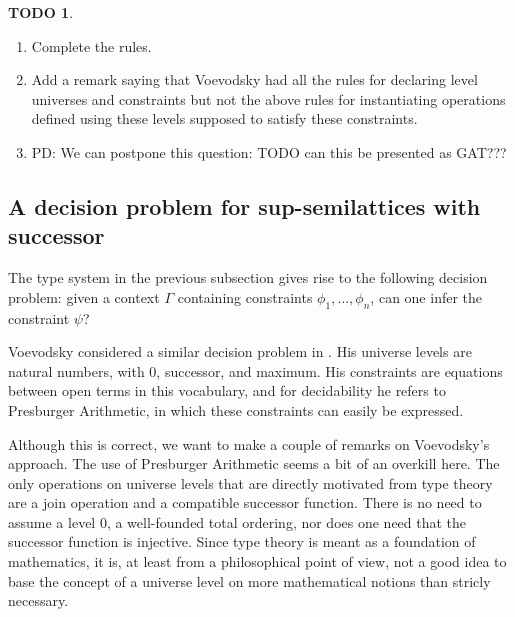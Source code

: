 \documentclass[11pt,a4paper]{article}
\theoremstyle{definition}
\newtheorem{TODO}{TODO}[theorem]
\def\UU{\mathsf{U}}
\begin{document}


\begin{TODO}
  \begin{enumerate}
  \item Complete the rules.
  \item Add a remark saying that Voevodsky had all the rules for declaring level universes and
    constraints but not the above rules for instantiating operations defined using these levels
    supposed to satisfy these constraints.
  \item PD: We can postpone this question: TODO   can this be presented as GAT???
   \end{enumerate}
 \end{TODO}

\subsection{A decision problem for sup-semilattices with successor}

The type system in the previous subsection gives rise to the following
decision problem: given a context $\Gamma$ containing constraints $\phi_1,\ldots,\phi_n$,
can one infer the constraint $\psi$?

Voevodsky considered a similar decision problem in \cite[Section 2]{VV}.
His universe levels are natural numbers, with 0, successor, and maximum.
His constraints are equations between open terms in this vocabulary,
and for decidability he refers to Presburger Arithmetic,
in which these constraints can easily be expressed.

Although this is correct, we want to make a couple of remarks on Voevodsky's approach.
The use of Presburger Arithmetic seems a bit of an overkill here.
The only operations on universe levels that are directly motivated
from type theory are a join operation and a compatible successor function.
There is no need to assume a level 0, a well-founded total ordering,
nor does one need that the successor function is injective.
Since type theory is meant as a foundation of mathematics, it is,
at least from a philosophical point of view,
not a good idea to base the concept of a universe level
on more mathematical notions than stricly necessary.
\end{document}

